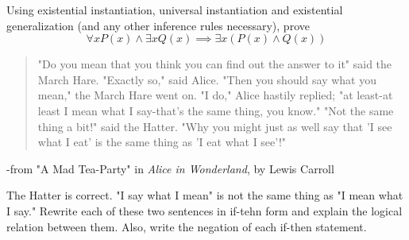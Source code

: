 \documentclass[paper=a4, fontsize=11pt]{jhwhw} %
\begin{document}
\problem{}
Using existential instantiation, universal instantiation and existential generalization (and any other inference rules necessary), prove
$$\forall x P(x) \land \exists x Q(x) \implies \exists x (P(x) \land Q(x))$$
\solution

\problem{}
\begin{quote}
	"Do you mean that you think you can find out the answer to it" said the March Hare. 
	"Exactly so," said Alice.
	"Then you should say what you mean," the March Hare went on.
	"I do," Alice hastily replied; "at least-at least I mean what I say-that's the same thing, you know."
	"Not the same thing a bit!" said the Hatter. "Why you might just as well say that 'I see what I eat' is the same thing as 'I eat what I see'!"
\end{quote}
\centerline{-from "A Mad Tea-Party" in \textit{Alice in Wonderland}, by Lewis Carroll}
The Hatter is correct. "I say what I mean" is not the same thing as "I mean what I say." Rewrite each of these two sentences in if-tehn form and explain the logical relation between them. Also, write the negation of each if-then statement.
\solution
\end{document}
